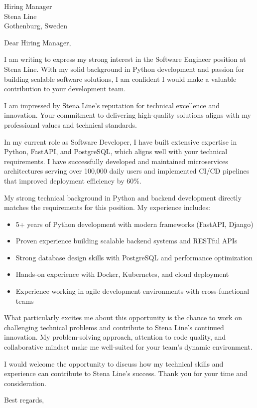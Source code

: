 \documentclass[11pt,a4paper]{letter}
\begin{document}
\begin{letter}{Hiring Manager \\ Stena Line \\ Gothenburg, Sweden}

\opening{Dear Hiring Manager,}

I am writing to express my strong interest in the Software Engineer position at Stena Line. With my solid background in Python development and passion for building scalable software solutions, I am confident I would make a valuable contribution to your development team.

I am impressed by Stena Line's reputation for technical excellence and innovation. Your commitment to delivering high-quality solutions aligns with my professional values and technical standards.

In my current role as Software Developer, I have built extensive expertise in Python, FastAPI, and PostgreSQL, which aligns well with your technical requirements. I have successfully developed and maintained microservices architectures serving over 100,000 daily users and implemented CI/CD pipelines that improved deployment efficiency by 60\%.

My strong technical background in Python and backend development directly matches the requirements for this position. My experience includes:

\begin{itemize}
\item 5+ years of Python development with modern frameworks (FastAPI, Django)
\item Proven experience building scalable backend systems and RESTful APIs
\item Strong database design skills with PostgreSQL and performance optimization
\item Hands-on experience with Docker, Kubernetes, and cloud deployment
\item Experience working in agile development environments with cross-functional teams
\end{itemize}

What particularly excites me about this opportunity is the chance to work on challenging technical problems and contribute to Stena Line's continued innovation. My problem-solving approach, attention to code quality, and collaborative mindset make me well-suited for your team's dynamic environment.

I would welcome the opportunity to discuss how my technical skills and experience can contribute to Stena Line's success. Thank you for your time and consideration.

\closing{Best regards,}

\end{letter}
\end{document}
